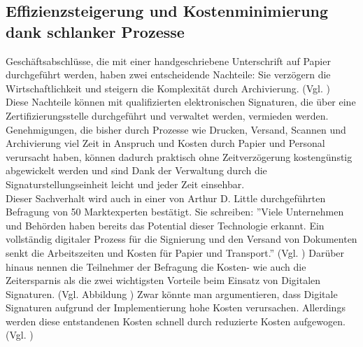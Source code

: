 \documentclass[deutsch]{lib/llncs/llncs}
\begin{document}
\subsection{Effizienzsteigerung und Kostenminimierung dank schlanker Prozesse}
Geschäftsabschlüsse, die mit einer handgeschriebene Unterschrift auf Papier durchgeführt werden, haben zwei entscheidende Nachteile: Sie verzögern die Wirtschaftlichkeit und steigern die Komplexität durch Archivierung. (Vgl. \cite[S. 3]{Zitat05})\\
Diese Nachteile können mit qualifizierten elektronischen Signaturen, die über eine Zertifizierungsstelle durchgeführt und verwaltet werden, vermieden werden. Genehmigungen, die bisher durch Prozesse wie Drucken, Versand, Scannen und Archivierung viel Zeit in Anspruch und Kosten durch Papier und Personal verursacht haben, können dadurch praktisch ohne Zeitverzögerung kostengünstig abgewickelt werden und sind Dank der Verwaltung durch die Signaturstellungseinheit leicht und jeder Zeit einsehbar. \\
Dieser Sachverhalt wird auch in einer von Arthur D. Little durchgeführten Befragung von 50 Marktexperten bestätigt. Sie schreiben: ''Viele Unternehmen und Behörden haben bereits das Potential dieser Technologie erkannt. Ein vollständig digitaler Prozess für die Signierung und den Versand von Dokumenten senkt die Arbeitszeiten und Kosten für Papier und Transport.'' (Vgl. \cite[S. 7]{Zitat05})
Darüber hinaus nennen die Teilnehmer der Befragung die Kosten- wie auch die Zeitersparnis als die zwei wichtigsten Vorteile beim Einsatz von Digitalen Signaturen. (Vgl. Abbildung \cite[S. 7]{Zitat05})
Zwar könnte man argumentieren, dass Digitale Signaturen aufgrund der Implementierung hohe Kosten verursachen. Allerdings werden diese entstandenen Kosten schnell durch reduzierte Kosten aufgewogen. (Vgl. \cite[S. 7]{Zitat05})
\end{document}
